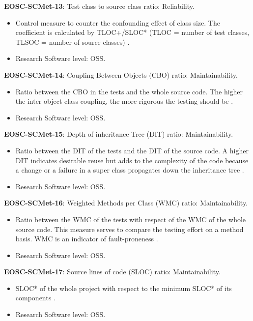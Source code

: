 \textbf{EOSC-SCMet-13}: Test class to source class ratio: Reliability.

\begin{itemize}
    \item Control measure to counter the confounding effect of class size. The coefficient is calculated by TLOC+/SLOC*  (TLOC = number of test classes, TLSOC = number of source classes) \cite{nagappan_early_2005}.
    \item Research Software level: OSS.
\end{itemize}

\textbf{EOSC-SCMet-14}: Coupling Between Objects (CBO) ratio: Maintainability.

\begin{itemize}
    \item Ratio between the CBO in the tests and the whole source code. The higher the inter-object class coupling, the more rigorous the testing should be \cite{nagappan_early_2005}.
    \item Research Software level: OSS.
\end{itemize}

\textbf{EOSC-SCMet-15}: Depth of inheritance Tree (DIT) ratio: Maintainability.

\begin{itemize}
    \item Ratio between the DIT of the tests and the DIT of the source code. A higher DIT indicates desirable reuse but adds to the complexity of the code because a change or a failure in a super class propagates down the inheritance tree \cite{nagappan_early_2005}.
    \item Research Software level: OSS.
\end{itemize}

\textbf{EOSC-SCMet-16}: Weighted Methods per Class (WMC) ratio: Maintainability.

\begin{itemize}
    \item Ratio between the WMC of the tests with respect of the WMC of the whole source code. This measure serves to compare the testing effort on a method basis. WMC is an indicator of fault-proneness \cite{nagappan_early_2005}.
    \item Research Software level: OSS.
\end{itemize}

\textbf{EOSC-SCMet-17}: Source lines of code (SLOC) ratio: Maintainability.

\begin{itemize}
    \item SLOC* of the whole project with respect to the minimum SLOC* of its components \cite{nagappan_early_2005}.
    \item Research Software level: OSS.
\end{itemize}

